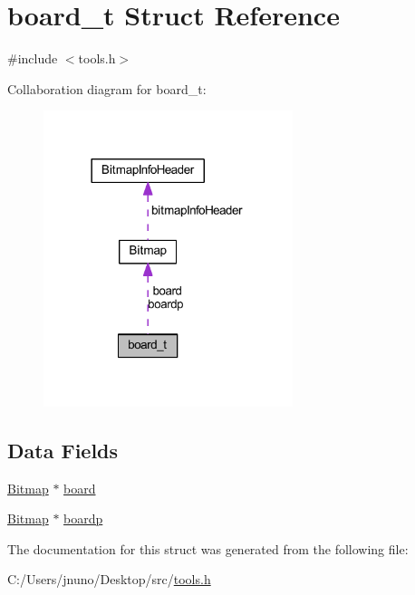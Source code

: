 \hypertarget{structboard__t}{}\section{board\+\_\+t Struct Reference}
\label{structboard__t}


{\ttfamily \#include $<$tools.\+h$>$}



Collaboration diagram for board\+\_\+t\+:
\nopagebreak
\begin{figure}[H]
\begin{center}
\leavevmode
\includegraphics[width=206pt]{structboard__t__coll__graph}
\end{center}
\end{figure}
\subsection*{Data Fields}
\begin{DoxyCompactItemize}
\item 
\hyperlink{struct_bitmap}{Bitmap} $\ast$ \hyperlink{group___game_ga2b89423d3599327880528e2d4ef4d95a}{board}
\item 
\hyperlink{struct_bitmap}{Bitmap} $\ast$ \hyperlink{group___game_ga39e613d7078d5537d3bbaaa3aed89f62}{boardp}
\end{DoxyCompactItemize}


The documentation for this struct was generated from the following file\+:\begin{DoxyCompactItemize}
\item 
C\+:/\+Users/jnuno/\+Desktop/src/\hyperlink{tools_8h}{tools.\+h}\end{DoxyCompactItemize}
